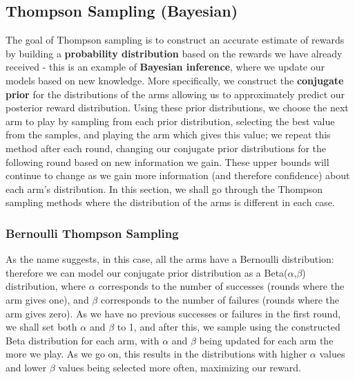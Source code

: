 \subsection{Thompson Sampling (Bayesian)}
The goal of Thompson sampling is to construct an accurate estimate of rewards by building a \textbf{probability distribution} based on the rewards we have already received - this is an example of \textbf{Bayesian inference}, where we update our models based on new knowledge. More specifically, we construct the \textbf{conjugate prior} for the distributions of the arms allowing us to approximately predict our posterior reward distribution. Using these prior distributions, we choose the next arm to play by sampling from each prior distribution, selecting the best value from the samples, and playing the arm which gives this value; we repeat this method after each round, changing our conjugate prior distributions for the following round based on new information we gain. These upper bounds will continue to change as we gain more information (and therefore confidence) about each arm's distribution. In this section, we shall go through the Thompson sampling methods where the distribution of the arms is different in each case. \citep{agrawal2012analysis}

\subsubsection{Bernoulli Thompson Sampling}
As the name suggests, in this case, all the arms have a Bernoulli distribution: therefore we can model our conjugate prior distribution as a Beta($\alpha$,$\beta$) distribution, where $\alpha$ corresponds to the number of successes (rounds where the arm gives one), and $\beta$ corresponds to the number of failures (rounds where the arm gives zero). As we have no previous successes or failures in the first round, we shall set both $\alpha$ and $\beta$ to 1, and after this, we sample using the constructed Beta distribution for each arm, with $\alpha$ and $\beta$ being updated for each arm the more we play. As we go on, this results in the distributions with higher $\alpha$ values and lower $\beta$ values being selected more often, maximizing our reward.

